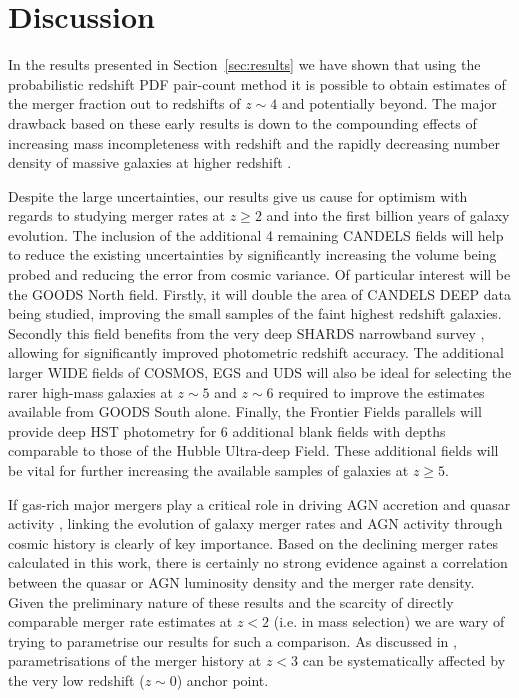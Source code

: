 \section{Discussion}\label{sec:discussion}
In the results presented in Section~\ref{sec:results} we have shown that using the probabilistic redshift PDF pair-count method it is possible to obtain estimates of the merger fraction out to redshifts of $z\sim4$ and potentially beyond. The major drawback based on these early results is down to the compounding effects of increasing mass incompleteness with redshift and the rapidly decreasing number density of massive galaxies at higher redshift \citep{Duncan:2014gh,Grazian:2014vx}. 

Despite the large uncertainties, our results give us cause for optimism with regards to studying merger rates at $z \geq 2$ and into the first billion years of galaxy evolution. The inclusion of the additional 4 remaining CANDELS fields will help to reduce the existing uncertainties by significantly increasing the volume being probed and reducing the error from cosmic variance. Of particular interest will be the GOODS North field. Firstly, it will double the area of CANDELS DEEP data being studied, improving the small samples of the faint highest redshift galaxies. Secondly this field benefits from the very deep SHARDS narrowband survey \citep{PerezGonzalez:2012fo}, allowing for significantly improved photometric redshift accuracy. The additional larger WIDE fields of COSMOS, EGS and UDS will also be ideal for selecting the rarer high-mass galaxies at $z\sim5$ and $z\sim6$ required to improve the estimates available from GOODS South alone. Finally, the Frontier Fields parallels \citep{Coe:2014tq} will provide deep HST photometry for 6 additional blank fields with depths comparable to those of the Hubble Ultra-deep Field. These additional fields will be vital for further increasing the available samples of galaxies at $z \geq 5$.

If gas-rich major mergers play a critical role in driving AGN accretion and quasar activity \citep{Springel:2005co,Hopkins:2008gr}, linking the evolution of galaxy merger rates and AGN activity through cosmic history is clearly of key importance. Based on the declining merger rates calculated in this work, there is certainly no strong evidence against a correlation between the quasar or AGN luminosity density and the merger rate density. Given the preliminary nature of these results and the scarcity of directly comparable merger rate estimates at $z < 2$ (i.e. in mass selection) we are wary of trying to parametrise our results for such a comparison. As discussed in \citet{Conselice:2014ct}, parametrisations of the merger history at $z < 3$ can be systematically affected by the very low redshift ($z\sim0$) anchor point. 


